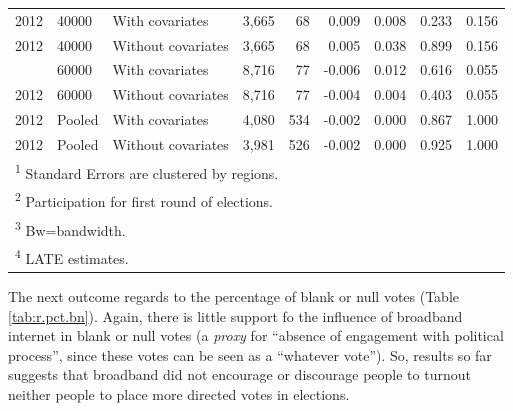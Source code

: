 \documentclass[12pt,]{article}
\begin{document}
\begin{table}[!h]
\begin{tabular}{lllrrrrrr}
2012 & 40000 & With covariates & 3,665 & 68 & 0.009 & 0.008 & 0.233 & 0.156\\
2012 & 40000 & Without covariates & 3,665 & 68 & 0.005 & 0.038 & 0.899 & 0.156\\
\addlinespace
2012 & 60000 & With covariates & 8,716 & 77 & -0.006 & 0.012 & 0.616 & 0.055\\
2012 & 60000 & Without covariates & 8,716 & 77 & -0.004 & 0.004 & 0.403 & 0.055\\
2012 & Pooled & With covariates & 4,080 & 534 & -0.002 & 0.000 & 0.867 & 1.000\\
2012 & Pooled & Without covariates & 3,981 & 526 & -0.002 & 0.000 & 0.925 & 1.000\\
\bottomrule
\multicolumn{9}{l}{\textsuperscript{1} Standard Errors are clustered by regions.}\\
\multicolumn{9}{l}{\textsuperscript{2} Participation for first round of elections.}\\
\multicolumn{9}{l}{\textsuperscript{3} Bw=bandwidth.}\\
\multicolumn{9}{l}{\textsuperscript{4} LATE estimates.}\\
\end{tabular}
\end{table}

The next outcome regards to the percentage of blank or null votes (Table
\ref{tab:r.pct.bn}). Again, there is little support fo the influence of
broadband internet in blank or null votes (a \emph{proxy} for ``absence
of engagement with political process'', since these votes can be seen as
a ``whatever vote''). So, results so far suggests that broadband did not
encourage or discourage people to turnout neither people to place more
directed votes in elections.
\end{document}
